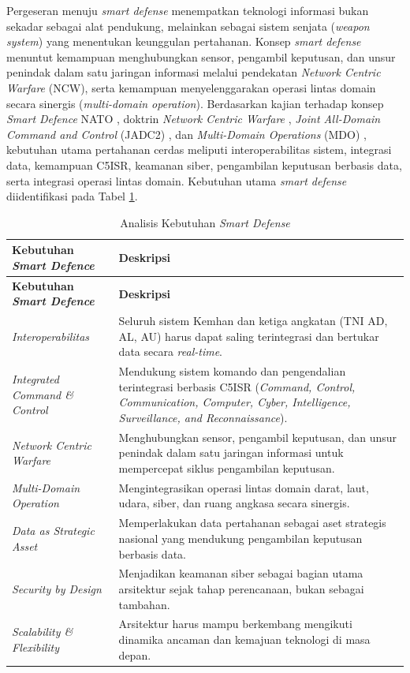 Pergeseran menuju \textit{smart defense} menempatkan teknologi informasi bukan sekadar sebagai alat pendukung, melainkan sebagai sistem senjata (\textit{weapon system}) yang menentukan keunggulan pertahanan.
Konsep \textit{smart defense} menuntut kemampuan menghubungkan sensor, pengambil keputusan, dan unsur penindak dalam satu jaringan informasi melalui pendekatan \textit{Network Centric Warfare} (NCW), serta kemampuan menyelenggarakan operasi lintas domain secara sinergis (\textit{multi-domain operation}).
Berdasarkan kajian terhadap konsep \textit{Smart Defence} NATO \autocite{NATO2012}, doktrin \textit{Network Centric Warfare} \autocite{scribd_network_centric_warfare}, \textit{Joint All-Domain Command and Control} (JADC2) \autocite{USDoD2022}, dan \textit{Multi-Domain Operations} (MDO) \autocite{USArmyMDO2018}, kebutuhan utama pertahanan cerdas meliputi interoperabilitas sistem, integrasi data, kemampuan C5ISR, keamanan siber, pengambilan keputusan berbasis data, serta integrasi operasi lintas domain.
Kebutuhan utama \textit{smart defense} diidentifikasi pada Tabel \ref{tab:kebutuhan-smartdefense}.

\begin{longtable}{|p{4cm}|p{9cm}|}
\caption{Analisis Kebutuhan \textit{Smart Defense}}
\label{tab:kebutuhan-smartdefense} \\
\hline
\textbf{Kebutuhan \textit{Smart Defence}} & \textbf{Deskripsi} \\
\hline
\endfirsthead
\hline
\textbf{Kebutuhan \textit{Smart Defence}} & \textbf{Deskripsi} \\
\hline
\endhead
\textit{Interoperabilitas} & Seluruh sistem Kemhan dan ketiga angkatan (TNI AD, AL, AU) harus dapat saling terintegrasi dan bertukar data secara \textit{real-time}. \\
\hline
\textit{Integrated Command \& Control} & Mendukung sistem komando dan pengendalian terintegrasi berbasis C5ISR (\textit{Command, Control, Communication, Computer, Cyber, Intelligence, Surveillance, and Reconnaissance}). \\
\hline
\textit{Network Centric Warfare} & Menghubungkan sensor, pengambil keputusan, dan unsur penindak dalam satu jaringan informasi untuk mempercepat siklus pengambilan keputusan. \\
\hline
\textit{Multi-Domain Operation} & Mengintegrasikan operasi lintas domain darat, laut, udara, siber, dan ruang angkasa secara sinergis. \\
\hline
\textit{Data as Strategic Asset} & Memperlakukan data pertahanan sebagai aset strategis nasional yang mendukung pengambilan keputusan berbasis data. \\
\hline
\textit{Security by Design} & Menjadikan keamanan siber sebagai bagian utama arsitektur sejak tahap perencanaan, bukan sebagai tambahan. \\
\hline
\textit{Scalability \& Flexibility} & Arsitektur harus mampu berkembang mengikuti dinamika ancaman dan kemajuan teknologi di masa depan. \\
\hline
\end{longtable}

